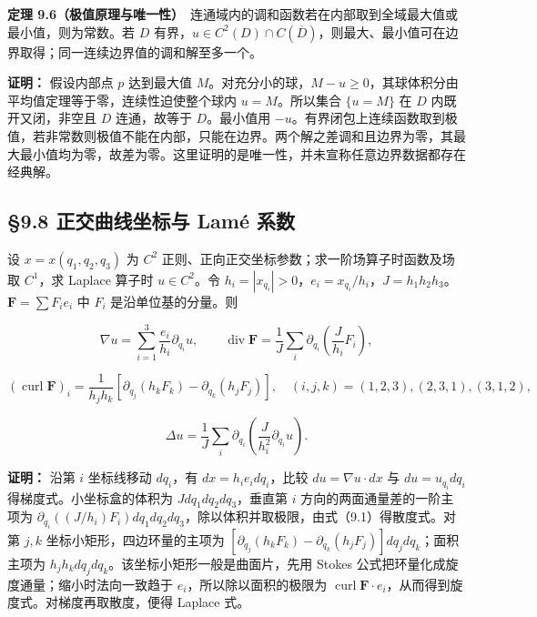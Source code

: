 \documentclass[11pt,a4paper]{article}
\begin{document}
\textbf{定理
9.6（极值原理与唯一性）}　连通域内的调和函数若在内部取到全域最大值或最小值，则为常数。若
\(D\)
有界，\(u\in C^2(D)\cap C(\overline D)\)，则最大、最小值可在边界取得；同一连续边界值的调和解至多一个。

\textbf{证明：} 假设内部点 \(p\) 达到最大值
\(M\)。对充分小的球，\(M-u\ge0\)，其球体积分由平均值定理等于零，连续性迫使整个球内
\(u=M\)。所以集合 \(\{u=M\}\) 在 \(D\) 内既开又闭，非空且 \(D\)
连通，故等于 \(D\)。最小值用
\(-u\)。有界闭包上连续函数取到极值，若非常数则极值不能在内部，只能在边界。两个解之差调和且边界为零，其最大最小值均为零，故差为零。这里证明的是唯一性，并未宣称任意边界数据都存在经典解。

\subsection{§9.8 正交曲线坐标与 Lamé
系数}\label{ux6b63ux4ea4ux66f2ux7ebfux5750ux6807ux4e0e-lamuxe9-ux7cfbux6570}

设 \(x=x(q_1,q_2,q_3)\) 为 \(C^2\)
正则、正向正交坐标参数；求一阶场算子时函数及场取 \(C^1\)，求 Laplace
算子时 \(u\in C^2\)。令
\(h_i=|x_{q_i}|>0\)，\(e_i=x_{q_i}/h_i\)，\(J=h_1h_2h_3\)。\(\mathbf F=\sum F_ie_i\)
中 \(F_i\) 是沿单位基的分量。则

\begin{equation*}
 \nabla u=\sum_{i=1}^3\frac{e_i}{h_i}\partial_{q_i}u,
 \qquad
 \operatorname{div}\mathbf F=\frac1J\sum_i\partial_{q_i}\left(\frac J{h_i}F_i\right),\tag{9.10}
\end{equation*}

\begin{equation*}
 (\operatorname{curl}\mathbf F)_i
 =\frac1{h_jh_k}\left[\partial_{q_j}(h_kF_k)-\partial_{q_k}(h_jF_j)\right],
 \quad(i,j,k)=(1,2,3),(2,3,1),(3,1,2),\tag{9.11}
\end{equation*}

\begin{equation*}
 \Delta u=\frac1J\sum_i\partial_{q_i}\left(\frac J{h_i^2}\partial_{q_i}u\right).\tag{9.12}
\end{equation*}

\textbf{证明：} 沿第 \(i\) 坐标线移动 \(dq_i\)，有
\(dx=h_ie_idq_i\)，比较 \(du=\nabla u\cdot dx\) 与 \(du=u_{q_i}dq_i\)
得梯度式。小坐标盒的体积为 \(Jdq_1dq_2dq_3\)，垂直第 \(i\)
方向的两面通量差的一阶主项为
\(\partial_{q_i}((J/h_i)F_i)dq_1dq_2dq_3\)，除以体积并取极限，由式（9.1）得散度式。对第
\(j,k\) 坐标小矩形，四边环量的主项为
\([\partial_{q_j}(h_kF_k)-\partial_{q_k}(h_jF_j)]dq_jdq_k\)；面积主项为
\(h_jh_kdq_jdq_k\)。该坐标小矩形一般是曲面片，先用 Stokes
公式把环量化成旋度通量；缩小时法向一致趋于 \(e_i\)，所以除以面积的极限为
\(\operatorname{curl}\mathbf F\cdot e_i\)，从而得到旋度式。对梯度再取散度，便得
Laplace 式。
\end{document}

